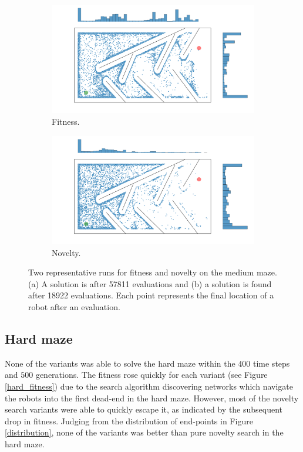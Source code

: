 \begin{figure}[H]
    \begin{mdframed}
        \begin{subfigure}[b]{0.45\textwidth}
            \includegraphics[scale=0.1]{resources/mazes/fitness_medium.png}
            \caption{Fitness.}
            \label{fitness_only}
        \end{subfigure}
        \begin{subfigure}[b]{0.5\textwidth}
            \includegraphics[scale=0.1]{resources/mazes/novelty_medium.png}
            \caption{Novelty.}
            \label{novelty_only}
        \end{subfigure}
    \end{mdframed}
    \caption{Two representative runs for fitness and novelty on the medium maze. (a) A solution is after 57811 evaluations
    and (b) a solution is found after 18922 evaluations. Each point represents the final location
    of a robot after an evaluation.}
    \label{typical_runs}
\end{figure}

\subsection{Hard maze}
None of the variants was able to solve the hard maze within the $400$ time steps and $500$ generations.
The fitness rose quickly for each variant (see Figure \ref{hard_fitness}) due to the search algorithm
discovering networks which navigate the robots into the first dead-end in the hard maze.
However, most of the novelty search variants
were able to quickly escape it, as indicated by the subsequent drop in fitness.
Judging from the distribution of end-points in Figure \ref{distribution}, none of the variants
was better than pure novelty search in the hard maze.

